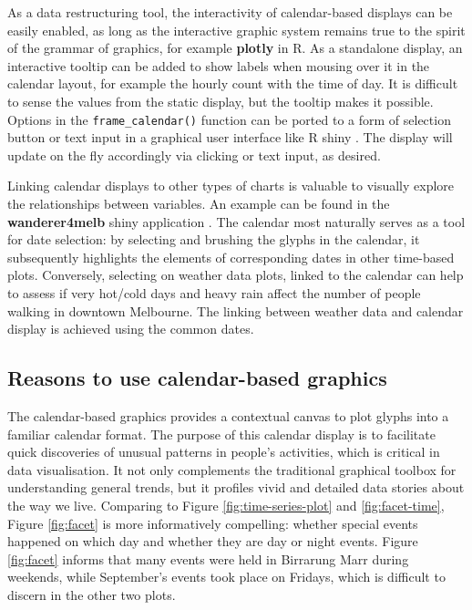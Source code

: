 \documentclass[12pt]{article}
\begin{document}
As a data restructuring tool, the interactivity of calendar-based displays can be easily enabled, as long as the interactive graphic system remains true to the spirit of the grammar of graphics, for example \textbf{plotly} \citep{plotly} in R. As a standalone display, an interactive tooltip can be added to show labels when mousing over it in the calendar layout, for example the hourly count with the time of day. It is difficult to sense the values from the static display, but the tooltip makes it possible. Options in the \texttt{frame\_calendar()} function can be ported to a form of selection button or text input in a graphical user interface like R shiny \citep{R-shiny}. The display will update on the fly accordingly via clicking or text input, as desired.

Linking calendar displays to other types of charts is valuable to visually explore the relationships between variables. An example can be found in the \textbf{wanderer4melb} shiny application \citep{R-wanderer4melb}. The calendar most naturally serves as a tool for date selection: by selecting and brushing the glyphs in the calendar, it subsequently highlights the elements of corresponding dates in other time-based plots. Conversely, selecting on weather data plots, linked to the calendar can help to assess if very hot/cold days and heavy rain affect the number of people walking in downtown Melbourne. The linking between weather data and calendar display is achieved using the common dates.

\hypertarget{reasons-to-use-calendar-based-graphics}{%
\subsection{Reasons to use calendar-based graphics}\label{reasons-to-use-calendar-based-graphics}}

The calendar-based graphics provides a contextual canvas to plot glyphs into a familiar calendar format. The purpose of this calendar display is to facilitate quick discoveries of unusual patterns in people's activities, which is critical in data visualisation. It not only complements the traditional graphical toolbox for understanding general trends, but it profiles vivid and detailed data stories about the way we live. Comparing to Figure \ref{fig:time-series-plot} and \ref{fig:facet-time}, Figure \ref{fig:facet} is more informatively compelling: whether special events happened on which day and whether they are day or night events. Figure \ref{fig:facet} informs that many events were held in Birrarung Marr during weekends, while September's events took place on Fridays, which is difficult to discern in the other two plots.
\end{document}
